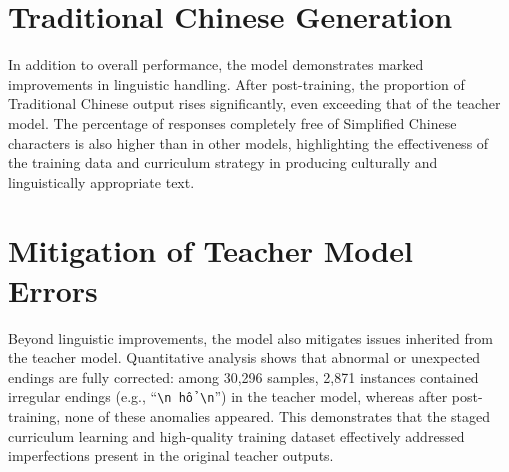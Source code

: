 \section{Traditional Chinese Generation}
In addition to overall performance, the model demonstrates marked improvements in linguistic handling. After post-training, the proportion of Traditional Chinese output rises significantly, even exceeding that of the teacher model. The percentage of responses completely free of Simplified Chinese characters is also higher than in other models, highlighting the effectiveness of the training data and curriculum strategy in producing culturally and linguistically appropriate text.

\section{Mitigation of Teacher Model Errors}
Beyond linguistic improvements, the model also mitigates issues inherited from the teacher model. Quantitative analysis shows that abnormal or unexpected endings are fully corrected: among 30,296 samples, 2,871 instances contained irregular endings (e.g., “\texttt{\textbackslash n hổ \textbackslash n}”) in the teacher model, whereas after post-training, none of these anomalies appeared. This demonstrates that the staged curriculum learning and high-quality training dataset effectively addressed imperfections present in the original teacher outputs.